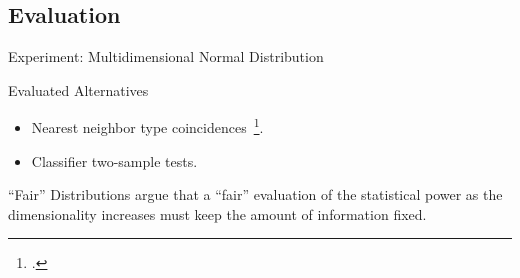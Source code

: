 \documentclass[10pt]{beamer}
\begin{document}
\subsection{Evaluation}

\begin{frame}{Experiment: Multidimensional Normal Distribution}
    \begin{block}{Evaluated Alternatives}
        \smallskip
        \begin{itemize}
            \item Nearest neighbor type coincidences~\footcite{Henze1988, Schilling1986b}.
            \item Classifier two-sample tests.
        \end{itemize}
    \end{block}
    \begin{block}{``Fair'' Distributions}
        \smallskip
        \cite{ramdas2015decreasing} argue that a ``fair'' evaluation of the
        statistical power as the dimensionality increases must keep the
        amount of information fixed.
    \end{block}

\end{frame}
\end{document}
